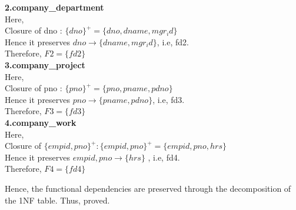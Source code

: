 \documentclass[12pt,letterpaper]{article}
\begin{document}
\textbf{2.company\_department}\\
Here,\\ 
Closure of dno : \(\{dno\}^{+} =  \{dno, dname, mgr_id\}\)\\
Hence it preserves \textbf{\(dno \rightarrow \{dname, mgr_id\}\)}, i.e, fd2. \\
Therefore,  \(F2 = \{ fd2 \}\)\\

\textbf{3.company\_project}\\
Here,\\ 
Closure of pno : \(\{pno\}^+ =  \{pno, pname, pdno\}\)\\
Hence it preserves \textbf{\(pno \rightarrow \{pname, pdno\}\)}, i.e, fd3. \\
Therefore,  \(F3 = \{ fd3 \}\)\\

\textbf{4.company\_work}\\
Here,\\ 
Closure of \(\{empid, pno\}^+ : \{empid, pno\}^+ =  \{empid, pno, hrs\}\)\\
Hence it preserves \textbf{\(empid, pno \rightarrow \{hrs\}\)} , i.e, fd4.\\
Therefore,  \(F4 = \{ fd4 \}\)\\


Hence, the functional dependencies are preserved through the decomposition of the 1NF table.
Thus, proved.

\bigskip
\end{document}
